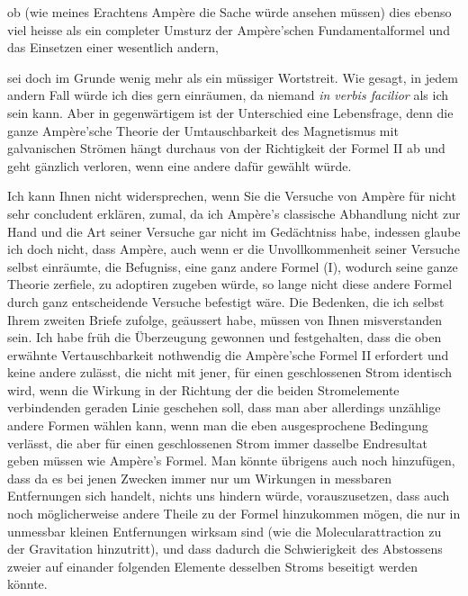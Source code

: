 \documentclass[fontsize=10pt,paper=a5,pagesize=auto]{scrbook}
\begin{document}
ob (wie meines Erachtens Ampère die Sache würde ansehen müssen) dies ebenso viel heisse als ein completer Umsturz der Ampère'schen Fundamentalformel und das Einsetzen einer wesentlich andern,

sei doch im Grunde wenig mehr als ein müssiger Wortstreit. Wie gesagt, in jedem andern Fall würde ich dies gern einräumen, da niemand \textit{in verbis facilior} als ich sein kann. Aber in gegenwärtigem ist der Unterschied eine Lebensfrage, denn die ganze Ampère'sche Theorie der Umtauschbarkeit des Magnetismus mit galvanischen Strömen hängt durchaus von der Richtigkeit der Formel II ab und geht gänzlich verloren, wenn eine andere dafür gewählt würde.

Ich kann Ihnen nicht widersprechen, wenn Sie die Versuche von Ampère für nicht sehr concludent erklären, zumal, da ich Ampère's classische Abhandlung nicht zur Hand und die Art seiner Versuche gar nicht im Gedächtniss habe, indessen glaube ich doch nicht, dass Ampère, auch wenn er die Unvollkommenheit seiner Versuche selbst einräumte, die Befugniss, eine ganz andere Formel (I), wodurch seine ganze Theorie zerfiele, zu adoptiren zugeben würde, so lange nicht diese andere Formel durch ganz entscheidende Versuche befestigt wäre. Die Bedenken, die ich selbst Ihrem zweiten Briefe zufolge, geäussert habe, müssen von Ihnen misverstanden sein. Ich habe früh die Überzeugung gewonnen und festgehalten, dass die oben erwähnte Vertauschbarkeit nothwendig die Ampère'sche Formel II erfordert und keine andere zulässt, die nicht mit jener, für einen geschlossenen Strom identisch wird, wenn die Wirkung in der Richtung der die beiden Stromelemente verbindenden geraden Linie geschehen soll, dass man aber allerdings unzählige andere Formen wählen kann, wenn man die eben ausgesprochene Bedingung verlässt, die aber für einen geschlossenen Strom immer dasselbe Endresultat geben müssen wie Ampère's Formel. Man könnte übrigens auch noch hinzufügen, dass da es bei jenen Zwecken immer nur um Wirkungen in messbaren Entfernungen sich handelt, nichts uns hindern würde, vorauszusetzen, dass auch noch möglicherweise andere Theile zu der Formel hinzukommen mögen, die nur in unmessbar kleinen Entfernungen wirksam sind (wie die Molecularattraction zu der Gravitation hinzutritt), und dass dadurch die Schwierigkeit des Abstossens zweier auf einander folgenden Elemente desselben Stroms beseitigt werden könnte.
\end{document}

